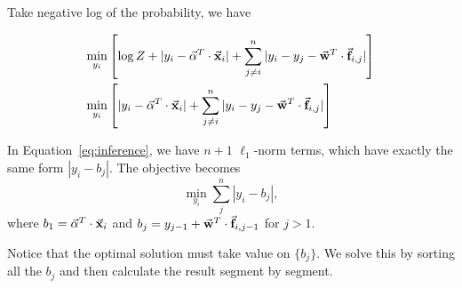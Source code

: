Take negative log of the probability, we have 

\begin{align}
\min_{y_i} &  \left[ \log Z +  |y_i - \vec{\mathbf{\alpha}}^T \cdot \vec{\mathbf{x}}_i| + \sum_{j \neq i}^n |y_i - y_j - \vec{\mathbf{w}}^T \cdot \vec{\mathbf{f}}_{i,j}| \right] \nonumber \\
\min_{y_i} & \left[ |y_i - \vec{\mathbf{\alpha}}^T \cdot \vec{\mathbf{x}}_i| + \sum_{j \neq i}^n |y_i - y_j - \vec{\mathbf{w}}^T \cdot \vec{\mathbf{f}}_{i,j}| \right] 
\label{eq:inference}
\end{align}

In Equation~\ref{eq:inference}, we have $n+1$ $\ell_1$-norm terms, which have exactly the same form $|y_i - b_j|$. The objective becomes
\begin{equation}
  \min_{y_i} \sum_j^n |y_i - b_j|,
\label{eq:infy}
\end{equation}
where $b_1 = \vec{\mathbf{\alpha}}^T \cdot \vec{\mathbf{x}}_i$ and $b_j = y_{j-1} + \vec{\mathbf{w}}^T\cdot \vec{\mathbf{f}}_{i,j-1}$ for $j > 1$.

Notice that the optimal solution must take value on $\{b_j\}$. We solve this by sorting all the $b_j$ and then calculate the result segment by segment.